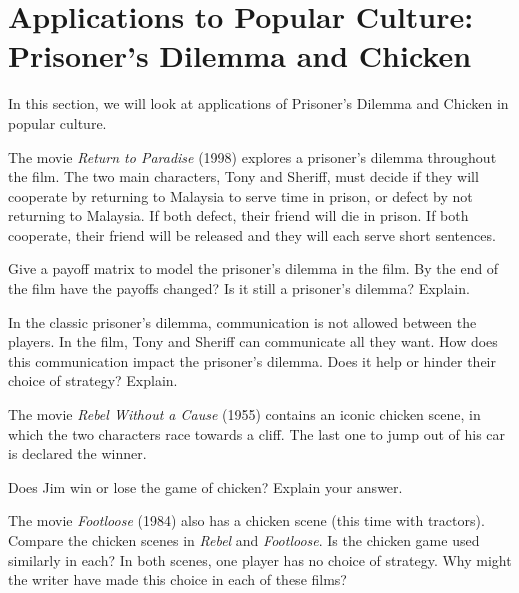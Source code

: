 
\section{Applications to Popular Culture: Prisoner's Dilemma and Chicken}




In this section, we will look at applications of Prisoner's Dilemma and Chicken in popular culture.


The movie \textit{Return to Paradise} (1998) explores a prisoner's dilemma throughout the film.  The two main characters, Tony and Sheriff, must decide if they will cooperate by returning to Malaysia to serve time in prison, or defect by not returning to Malaysia. If both defect, their friend will die in prison. If both cooperate, their friend will be released and they will each serve short sentences.

\begin{writing}
Give a payoff matrix to model the prisoner's dilemma in the film. By the end of the film have the payoffs changed? Is it still a prisoner's dilemma? Explain.
\end{writing}

\begin{writing} In the classic prisoner's dilemma, communication is not allowed between the players. In the film, Tony and Sheriff can communicate all they want. How does this communication impact the prisoner's dilemma. Does it help or hinder their choice of strategy? Explain.
\end{writing}



The movie \textit{Rebel Without a Cause} (1955) contains an iconic chicken scene, in which the two characters race towards a cliff. The last one to jump out of his car is declared the winner.



\begin{writing}
Does Jim win or lose the game of chicken? Explain your answer. 
\end{writing}

\begin{writing}
The movie \textit{Footloose} (1984) also has a chicken scene (this time with tractors). Compare the chicken scenes in \textit{Rebel} and \textit{Footloose}. Is the chicken game used similarly in each? In both scenes, one player has no choice of strategy. Why might the writer have made this choice in each of these films?
\end{writing}



